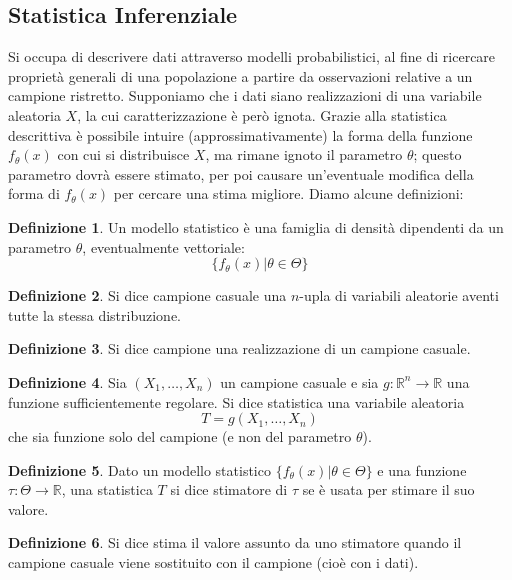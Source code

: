 \documentclass{article}
\theoremstyle{plain}
\theoremstyle{definition}
\newtheorem{definizione}{Definizione}[section]
\theoremstyle{remark}
\begin{document}
\subsection{Statistica Inferenziale} %
\label{sub:statistica_inferenziale}
Si occupa di descrivere dati attraverso modelli probabilistici, al fine di ricercare proprietà generali di una popolazione a partire da osservazioni relative a un campione ristretto. Supponiamo che i dati siano realizzazioni di una variabile aleatoria $X$, la cui caratterizzazione è però ignota. Grazie alla statistica descrittiva è possibile intuire (approssimativamente) la forma della funzione $f_\theta(x)$ con cui si distribuisce $X$, ma rimane ignoto il parametro $\theta$; questo parametro dovrà essere stimato, per poi causare un'eventuale modifica della forma di $f_\theta(x)$ per cercare una stima migliore. Diamo alcune definizioni:
\begin{definizione}
	Un modello statistico è una famiglia di densità dipendenti da un parametro $\theta$, eventualmente vettoriale:
	\begin{equation*}
		\{f_\theta(x)|\theta\in\Theta\}
	\end{equation*}
\end{definizione}
\begin{definizione}
	Si dice campione casuale una $n$-upla di variabili aleatorie aventi tutte la stessa distribuzione.
\end{definizione}
\begin{definizione}
	Si dice campione una realizzazione di un campione casuale.
\end{definizione}
\begin{definizione}
	Sia $(X_1,\dots,X_n)$ un campione casuale e sia $g:\mathds{R}^n\to\mathds{R}$ una funzione sufficientemente regolare. Si dice statistica una variabile aleatoria
	\begin{equation*}
		T=g(X_1,\dots,X_n)
	\end{equation*}
	che sia funzione solo del campione (e non del parametro $\theta$).
\end{definizione}
\begin{definizione}
	Dato un modello statistico $\{f_\theta(x)|\theta\in\Theta\}$ e una funzione $\tau:\Theta\to\mathds{R}$, una statistica $T$ si dice stimatore di $\tau$ se è usata per stimare il suo valore.
\end{definizione}
\begin{definizione}
	Si dice stima il valore assunto da uno stimatore quando il campione casuale viene sostituito con il campione (cioè con i dati).
\end{definizione}
\end{document}
